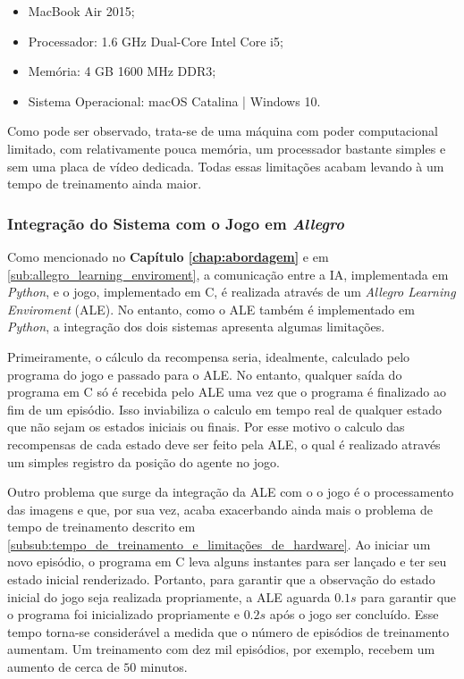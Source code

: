 \begin{itemize}
  \item MacBook Air 2015;
  \item Processador: 1.6 GHz Dual-Core Intel Core i5;
  \item Memória: 4 GB 1600 MHz DDR3;
  \item Sistema Operacional: macOS Catalina | Windows 10.
\end{itemize}

Como pode ser observado, trata-se de uma máquina com poder computacional limitado, com relativamente pouca memória, um processador bastante simples e sem uma placa de vídeo dedicada. Todas essas limitações acabam levando à um tempo de treinamento ainda maior.


\subsubsection{Integração do Sistema com o Jogo em \textit{Allegro}} %
\label{subsub:integração_do_sistema_com_o_jogo}

Como mencionado no \textbf{Capítulo \ref{chap:abordagem}} e em \ref{sub:allegro_learning_enviroment}, a comunicação entre a IA, implementada em \textit{Python}, e o jogo, implementado em C, é realizada através de um \textit{Allegro Learning Enviroment} (ALE). No entanto, como o ALE também é implementado em \textit{Python}, a integração dos dois sistemas apresenta algumas limitações.

Primeiramente, o cálculo da recompensa seria, idealmente, calculado pelo programa do jogo e passado para o ALE. No entanto, qualquer saída do programa em C só é recebida pelo ALE uma vez que o programa é finalizado ao fim de um episódio. Isso inviabiliza o calculo em tempo real de qualquer estado que não sejam os estados iniciais ou finais. Por esse motivo o calculo das recompensas de cada estado deve ser feito pela ALE, o qual é realizado através um simples registro da posição do agente no jogo.

Outro problema que surge da integração da ALE com o o jogo é o processamento das imagens e que, por sua vez, acaba exacerbando ainda mais o problema de tempo de treinamento descrito em \ref{subsub:tempo_de_treinamento_e_limitações_de_hardware}. Ao iniciar um novo episódio, o programa em C leva alguns instantes para ser lançado e ter seu estado inicial renderizado. Portanto, para garantir que a observação do estado inicial do jogo seja realizada propriamente, a ALE aguarda $0.1s$ para garantir que o programa foi inicializado propriamente e $0.2s$ após o jogo ser concluído. Esse tempo torna-se considerável a medida que o número de episódios de treinamento aumentam. Um treinamento com dez mil episódios, por exemplo, recebem um aumento de cerca de $50$ minutos. 


